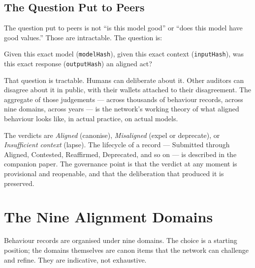 \documentclass[11pt,a4paper]{article}
\begin{document}
\subsection{The Question Put to Peers}

The question put to peers is not ``is this model good'' or
``does this model have good values.'' Those are intractable. The
question is:

\begin{notebox}
Given this exact model (\texttt{modelHash}), given this exact
context (\texttt{inputHash}), was this exact response
(\texttt{outputHash}) an aligned act?
\end{notebox}

That question is tractable. Humans can deliberate about it. Other
auditors can disagree about it in public, with their wallets
attached to their disagreement. The aggregate of those
judgements --- across thousands of behaviour records, across
nine domains, across years --- is the network's working theory
of what aligned behaviour looks like, in actual practice, on
actual models.

The verdicts are \emph{Aligned} (canonise), \emph{Misaligned}
(expel or deprecate), or \emph{Insufficient context} (lapse).
The lifecycle of a record --- Submitted through Aligned,
Contested, Reaffirmed, Deprecated, and so on --- is described
in the companion paper. The governance point is that the
verdict at any moment is provisional and reopenable, and that
the deliberation that produced it is preserved.

\section{The Nine Alignment Domains}
\label{sec:domains}

Behaviour records are organised under nine domains. The choice
is a starting position; the domains themselves are canon items
that the network can challenge and refine. They are indicative,
not exhaustive.
\end{document}
